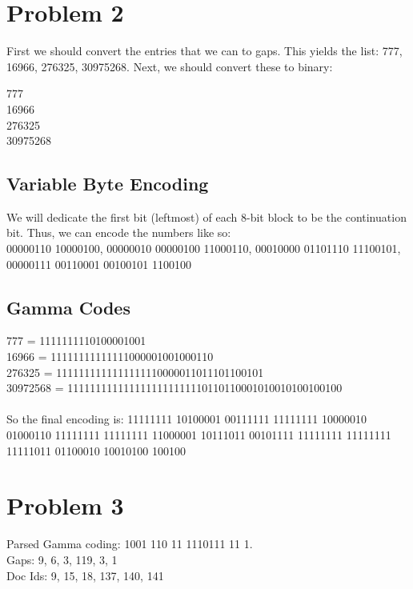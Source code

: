\documentclass{article}%
\begin{document}
\section*{Problem 2}
First we should convert the entries that we can to gaps. This yields the list: 777, 16966, 276325, 30975268. Next, we should convert these to binary:\\
\begin{center}
    777 \rightarrow {} \\
    16966 \rightarrow {} \\
    276325 \rightarrow {} \\
    30975268 \rightarrow {} \\
\end{center}

\subsection*{Variable Byte Encoding}
We will dedicate the first bit (leftmost) of each 8-bit block to be the continuation bit. Thus, we can encode the numbers like so:\\
00000110 10000100, 00000010  00000100 11000110, 00010000  01101110 11100101, 00000111  00110001 00100101 1100100

\subsection*{Gamma Codes}

777 = 1111111110100001001\\
16966 = 11111111111111000001001000110\\
276325 = 1111111111111111110000011011101100101\\
30972568 = 1111111111111111111111110110110001010010100100100\\
\\
So the final encoding is: 11111111 10100001 00111111 11111111 10000010 01000110 11111111 11111111 11000001 10111011 00101111 11111111 11111111 11111011 01100010 10010100 100100

\section*{Problem 3}

Parsed Gamma coding: 1001 110 11 1110111 11 1.\\
Gaps: 9, 6, 3, 119, 3, 1\\
Doc Ids: 9, 15, 18, 137, 140, 141
\end{document}
